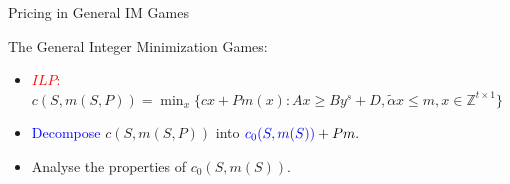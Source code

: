 \documentclass[14pt]{beamer}
\begin{document}
\begin{frame}{Pricing in General IM Games}
	\begin{definition}
	\small
	\justifying
	The General Integer Minimization Games:\\
	\begin{itemize}
	\justifying
		\item \textcolor{red}{$ILP:$}
		$c(S,m(S,P))= \mathop{\min}_{x} \{ cx+Pm(x): Ax \geq By^s+D, \tilde{\alpha}x \leq m, x \in \mathbb{Z}^{t \times 1} \}$
		\vspace{2pt}
		\item \textcolor{blue}{Decompose} $c(S,m(S,P))$ into $\textcolor{blue}{c_0(S,m(S))}+Pm.$
		\vspace{2pt}
		\item Analyse the properties of $c_0(S,m(S))$.
	\end{itemize}
	\end{definition}
\end{frame}
\end{document}
